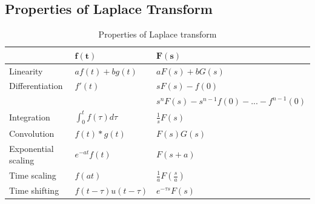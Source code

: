 \documentclass[12pt,a4paper]{article}
\begin{document}


\subsection{Properties of Laplace Transform}
\begin{table}[H]\centering
\caption{Properties of Laplace transform}
\begin{tabular}{p{4cm}|p{3cm}|p{6cm}}
\hline
& $\boldsymbol{f(t)}$ & $\boldsymbol{F(s)}$\\ \hline
Linearity & $af(t)+bg(t)$ & $aF(s)+bG(s)$ \\ [1.5ex] \hline
Differentiation & $f'(t)$  & $ sF(s)-f(0)$ \\ 
&&$s^{n}F(s)-s^{n-1}f(0)-...-  f^{n-1}(0)$\\[1.5ex] \hline
Integration& $\int_{0}^{t}f(\tau)d\tau$ &  $\frac{1}{s} F(s)$  \\  [1.5ex] \hline
Convolution&  $f(t)*g(t)$ & $F(s)G(s)$  \\ [1.5ex]  \hline
Exponential scaling & $e^{-at}f(t)$ & $F(s+a)$  \\ [1.5ex] \hline
Time scaling & $f(at)$ & $\frac{1}{a}F(\frac{s}{a})$\\ [1.5ex] \hline
Time shifting & $f(t-\tau)u(t-\tau)$ & $e^{-\tau s}F(s)$ \\ [1.5ex] \hline
\end{tabular}
\end{table}
\end{document}
